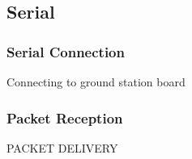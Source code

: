 \subsectionfont{\fontsize{14}{14}\selectfont}


\subsection{Serial}

\subsubsection{Serial Connection}
Connecting to ground station board\\

\subsubsection{Packet Reception}
PACKET DELIVERY\\
